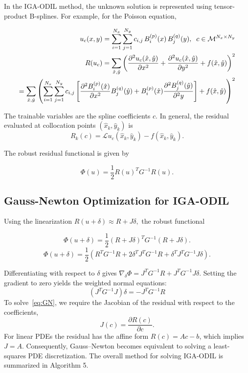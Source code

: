 \documentclass[review]{elsarticle}
\newcommand{\Lop}{\mathcal{L}}
\begin{document}
In the IGA-ODIL method, the unknown solution is represented using tensor-product B-splines. For example, for the Poisson equation,

\begin{eqnarray}
u_c(x,y) = \sum_{i=1}^{N_x} \sum_{j=1}^{N_y} c_{i,j}\, B_i^{(p)}(x)\, B_j^{(q)}(y), \; \; 
 c \in {\cal M}^{N_x \times N_y} \\
R(u_c)=\sum_{\hat{x},\hat{y}}\left(\frac{\partial^2 u_{c}(\hat{x},\hat{y})}{\partial x^2}+\frac{\partial^2 u_{c}(\hat{x},\hat{y})}{\partial y^2}+f(\hat{x},\hat{y})\right)^2 \\
=\sum_{\hat{x},\hat{y}}\left(
\sum_{i=1}^{N_x} \sum_{j=1}^{N_y} c_{i,j} \left[
\frac{\partial^2 B_i^{(p)}(\hat{x})}{\partial x^2}B_j^{(q)}(\hat{y})+B_i^{(p)}(\hat{x})\frac{\partial^2 B_j^{(q)}(\hat{y})}{\partial^2 y}\right] + f(\hat{x},\hat{y})\right)^2
\end{eqnarray}

The trainable variables are the spline coefficients $c$.
In general, the residual evaluated at collocation points $(\hat{x}_k,\hat{y}_k)$ is
\begin{equation}
R_k(c)=\Lop u_c(\hat{x}_k,\hat{y}_k)-f(\hat{x}_k,\hat{y}_k).
\end{equation}

The robust residual functional is given by

\begin{equation}
\Phi(u)
=
\frac12
R(u)^T G^{-1} R(u).
\end{equation}

\subsection{Gauss-Newton Optimization for IGA-ODIL}

Using the linearization $
R(u+\delta)
\approx
R + J\delta,$ the robust functional 

\begin{equation}
\Phi(u+\delta)
=
\frac12
(R+J\delta)^T
G^{-1}
(R+J\delta).
\end{equation}
\begin{equation}
\Phi(u+\delta)
=
\frac12
\left(
R^T G^{-1} R
+
2\delta^T J^T G^{-1} R
+
\delta^T J^T G^{-1} J \delta
\right).
\end{equation}

Differentiating with respect to $\delta$ gives
$
\nabla_\delta \Phi
=
J^T G^{-1} R
+
J^T G^{-1} J \delta.
$
Setting the gradient to zero yields the weighted normal equations:
\begin{equation}
(J^T G^{-1} J)\delta
=
-
J^T G^{-1} R \label{eq:GN}
\end{equation}
To solve~\eqref{eq:GN}, we require the Jacobian of the residual with respect to the coefficients,
\begin{equation}
J(c) = \frac{\partial R(c)}{\partial c}.
\end{equation}
For linear PDEs the residual has the affine form
$R(c)=Ac-b$, 
which implies $J=A$.
Consequently, Gauss–Newton becomes equivalent to solving a least-squares PDE discretization.
The overall method for solving IGA-ODIL is summarized in Algorithm 5.
\end{document}
